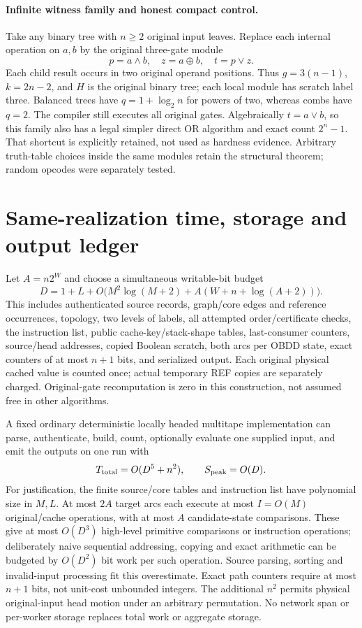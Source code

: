 \documentclass[11pt]{article}
\begin{document}
\paragraph{Infinite witness family and honest compact control.}
Take any binary tree with $n\ge2$ original input leaves. Replace each internal operation on $a,b$ by the original three-gate module
\[
 p=a\land b,\quad z=a\oplus b,\quad t=p\lor z.
\]
Each child result occurs in two original operand positions. Thus $g=3(n-1)$, $k=2n-2$, and $H$ is the original binary tree; each local module has scratch label three. Balanced trees have $q=1+\log_2 n$ for powers of two, whereas combs have $q=2$. The compiler still executes all original gates. Algebraically $t=a\lor b$, so this family also has a legal simpler direct OR algorithm and exact count $2^n-1$. That shortcut is explicitly retained, not used as hardness evidence. Arbitrary truth-table choices inside the same modules retain the structural theorem; random opcodes were separately tested.

\section{Same-realization time, storage and output ledger}
Let $A=n2^W$ and choose a simultaneous writable-bit budget
\[
 D=1+L+O\bigl(M^2\log(M+2)+A(W+n+\log(A+2))\bigr).
\]
This includes authenticated source records, graph/core edges and reference occurrences, topology, two levels of labels, all attempted order/certificate checks, the instruction list, public cache-key/stack-shape tables, last-consumer counters, source/head addresses, copied Boolean scratch, both arcs per OBDD state, exact counters of at most $n+1$ bits, and serialized output. Each original physical cached value is counted once; actual temporary REF copies are separately charged. Original-gate recomputation is zero in this construction, not assumed free in other algorithms.

A fixed ordinary deterministic locally headed multitape implementation can parse, authenticate, build, count, optionally evaluate one supplied input, and emit the outputs on one run with
\[
 T_{\rm total}=O(D^5+n^2),\qquad S_{\rm peak}=O(D).
\]
For justification, the finite source/core tables and instruction list have polynomial size in $M,L$. At most $2A$ target arcs each execute at most $I=O(M)$ original/cache operations, with at most $A$ candidate-state comparisons. These give at most $O(D^3)$ high-level primitive comparisons or instruction operations; deliberately naive sequential addressing, copying and exact arithmetic can be budgeted by $O(D^2)$ bit work per such operation. Source parsing, sorting and invalid-input processing fit this overestimate. Exact path counters require at most $n+1$ bits, not unit-cost unbounded integers. The additional $n^2$ permits physical original-input head motion under an arbitrary permutation. No network span or per-worker storage replaces total work or aggregate storage.
\end{document}
